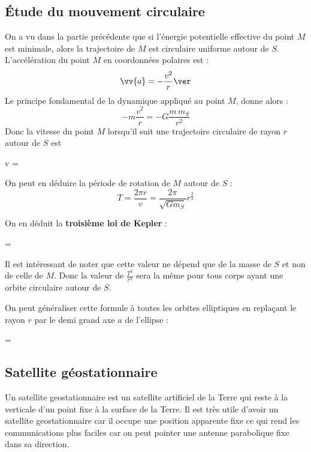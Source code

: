 \documentclass{cours}
\begin{document}
\subsection{Étude du mouvement circulaire}%
\label{sub:etude_du_mouvement_circulaire}
On a vu dans la partie précédente que si l'énergie potentielle effective du point $M$ est minimale, alors la trajectoire de $M$ est circulaire uniforme autour de $S$. L'accélération du point $M$ en coordonnées polaires est :
\begin{equation}
  \vv{a} = -\frac{v^2}{r}\ver
\end{equation}
Le principe fondamental de la dynamique appliqué au point $M$, donne alors :
\begin{equation}
  -m\frac{v^2}{r} = -G\frac{m\, m_S}{r^2}  
\end{equation}
Donc la vitesse du point $M$ lorsqu'il suit une trajectoire circulaire de rayon $r$ autour de $S$ est
\begin{eqencadre}
  v = 
  \label{eq:vitesse_orbite}
\end{eqencadre}

On peut en déduire la période de rotation de $M$ autour de $S$ :
\begin{equation}
  T = \frac{2\pi r}{v} = \frac{2\pi}{\sqrt{Gm_S}}r^\frac{3}{2}
\end{equation}

On en déduit la \textbf{troisième loi de Kepler} :
\begin{eqencadre}
   = 
\end{eqencadre}

Il est intéressant de noter que cette valeur ne dépend que de la masse de $S$ et non de celle de $M$. Donc la valeur de $\frac{T^2}{r^3}$ sera la même pour tous corps ayant une orbite circulaire autour de $S$.

On peut généraliser cette formule à toutes les orbites elliptiques en replaçant le rayon $r$ par le demi grand axe $a$ de l'ellipse :
\begin{eqencadre}
   = 
\end{eqencadre}


\subsection{Satellite géostationnaire}%
\label{sub:satellite_geostationnaire}
Un satellite geostationnaire est un satellite artificiel de la Terre qui reste à la verticale d'un point fixe à la surface de la Terre. Il est très utile d'avoir un satellite geostationnaire car il occupe une position apparente fixe ce qui rend les communications plus faciles car on peut pointer une antenne parabolique fixe dans sa direction.
\end{document}

